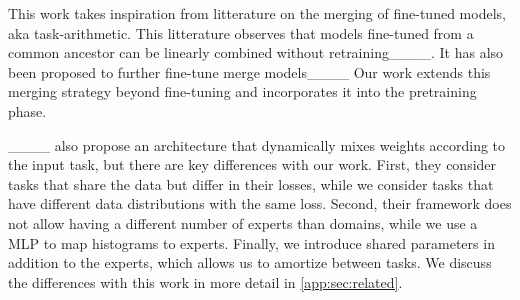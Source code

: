 This work takes inspiration from litterature on the merging of fine-tuned models, aka task-arithmetic. This litterature observes that models
fine-tuned from a common ancestor can be linearly combined without retraining____. It has also been proposed to further fine-tune merge models____
Our work extends this merging strategy beyond fine-tuning and incorporates it into the pretraining phase.  

____ also propose an architecture that dynamically mixes weights according to the input task, but there are key differences with our work. 
First, they consider tasks that share the data but differ in their losses, while we consider tasks that have different data distributions with the same loss.
Second, their framework does not allow having a different number of experts than domains, while we use a MLP to map histograms to experts.
Finally, we introduce shared parameters in addition to the experts, which allows us to amortize between tasks.
We discuss the differences with this work in more detail in \autoref{app:sec:related}.